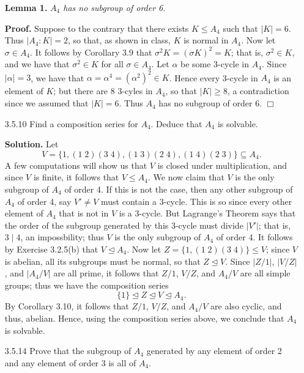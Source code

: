 \documentclass[9pt]{article}
\newcommand{\qed}{\hfill \ensuremath{\Box}}
\begin{document}
\begin{enumerate}
   \item[\textbf{Lemma 1.}] \textit{$A_4$ has no subgroup of order 6}.
   
   \textbf{Proof.} Suppose to the contrary that there exists $K \le A_4$ such 
   that $|K| = 6$. Thus $|A_4 : K| = 2$, so that, as shown in class, $K$ is 
   normal in $A_4$. Now let $\sigma \in A_4$. It follows by Corollary 3.9 that
   $\sigma^2K = (\sigma K)^2 = K$; that is, $\sigma^2 \in K$, and we have that
   $\sigma^2 \in K$ for all $\sigma \in A_4$. Let $\alpha$ be some 3-cycle in
   $A_4$. Since $|\alpha| = 3$, we have that
   $\alpha = \alpha^4 = (\alpha^2)^2 \in K$. Hence every 3-cycle in $A_4$ is
   an element of $K$; but there are 8 3-cyles in $A_4$, so that $|K| \ge 8$,
   a contradiction since we assumed that $|K| = 6$. Thus $A_4$ has no subgroup
   of order 6. \qed
   \item[3.5.10]  Find a composition series for $A_4$. Deduce that $A_4$ is
                  solvable.
                  
      \textbf{Solution.} Let
      $$V = \{1, (1\;2)(3\;4), (1\;3)(2\;4), (1\;4)(2\;3)\} \subseteq A_4.$$
      A few computations will show us that $V$ is closed under multiplication,
      and since $V$ is finite, it follows that $V \le A_4$. We now claim that
      $V$ is the only subgroup of $A_4$ of order 4. If this is not the case,
      then any other subgroup of $A_4$ of order 4, say $V' \neq V$ must contain
      a 3-cycle. This is so since every other element of $A_4$ that is not in
      $V$ is a 3-cycle. But Lagrange's Theorem says that the order of the
      subgroup generated by this 3-cycle must divide $|V'|$; that is,
      $3 \mid 4$, an impossbility; thus $V$ is the only subgroup of $A_4$ of 
      order 4. It follows by Exercise 3.2.5(b) that $V \trianglelefteq A_4$. Now 
      let $Z = \{1, (1\;2)(3\;4)\} \le V$; since $V$ is abelian, all its 
      subgroups must be normal, so that $Z \trianglelefteq V$. Since $|Z/{1}|$, 
      $|V/Z|$, and $|A_4/V|$ are all prime, it follows that $Z/{1}$, $V/Z$, and 
      $A_4/V$ are all simple groups; thus we have the composition series
      $$\{1\} \trianglelefteq Z \trianglelefteq V \trianglelefteq A_4.$$
      By Corollary 3.10, it follows that $Z/{1}$, $V/Z$, and $A_4/V$ are also
      cyclic, and thus, abelian. Hence, using the composition series above, we
      conclude that $A_4$ is solvable.
   \item[3.5.14]  Prove that the subgroup of $A_4$ generated by any element of
                  order 2 and any element of order 3 is all of $A_4$.
                  

\end{enumerate}
\end{document}
